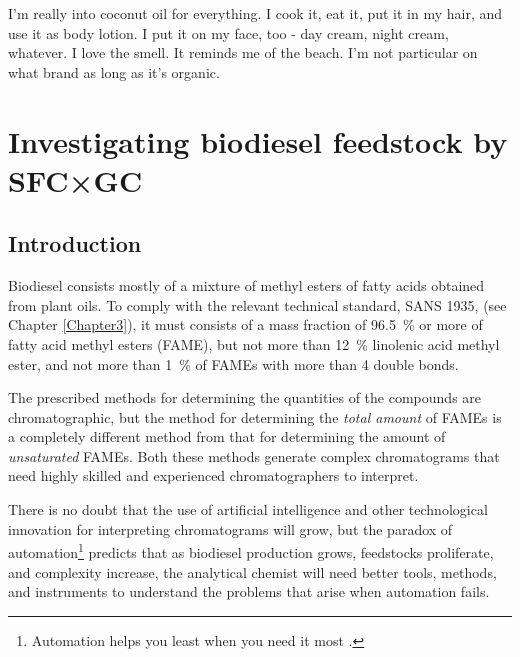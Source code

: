 
\begin{savequote}[80mm] I'm really into coconut oil for everything. I cook it,
eat it, put it in my hair, and use it as body lotion. I put it on my face, too -
day cream, night cream, whatever. I love the smell. It reminds me of the beach.
I'm not particular on what brand as long as it's organic.

\end{savequote}

\chapter{Investigating biodiesel feedstock by SFC×GC} %

\label{Chapter6} %

\section{Introduction}


Biodiesel consists mostly of a mixture of methyl esters of fatty acids obtained
from plant oils. To comply with the relevant technical standard, SANS 1935,
\autocite{SANS1935} (see Chapter \ref{Chapter3}), it must consists of a mass
fraction of \SI{96.5}{\percent} or more of fatty acid methyl esters (FAME), but
not more than \SI{12}{\percent} linolenic acid methyl ester, and not more than
\SI{1}{\percent} of FAMEs with more than \num{4} double bonds.

The prescribed methods for determining the quantities of the compounds are
chromatographic, but the method for  determining the \textit{total amount} of
FAMEs is a completely different method from that for determining the amount of
\textit{unsaturated} FAMEs. Both these methods generate complex chromatograms
that need highly skilled and experienced chromatographers to interpret.

There is no doubt that the use of artificial intelligence and other
technological innovation for interpreting chromatograms will grow, but the
paradox of automation\footnote{Automation helps you least when you need it most
\autocite{Strauch2018, Bainbridge1983}.} predicts that as biodiesel production
grows, feedstocks proliferate, and complexity increase, the analytical chemist
will need better tools, methods, and instruments to understand the problems that
arise when automation fails.

